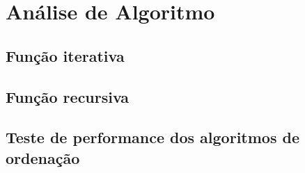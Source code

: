 \chapter{Análise de Algoritmo}
\label{ch:anal_de_alg} %

\section{Função iterativa}

\section{Função recursiva}

\section{Teste de performance dos algoritmos de ordenação}
